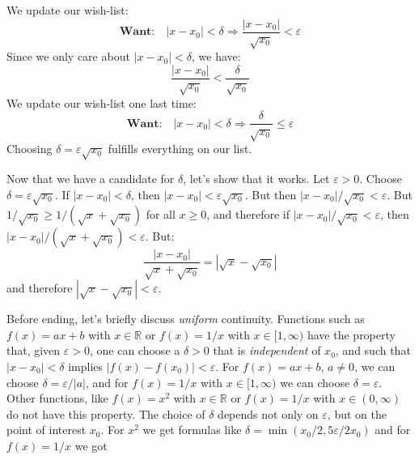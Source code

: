 \documentclass{article}
\theoremstyle{normal}
\theoremstyle{plain}
\begin{document}
    We update our wish-list:
    \begin{equation}
        \textbf{Want:}\quad
        |x-x_{0}|<\delta
        \Rightarrow
        \frac{|x-x_{0}|}{\sqrt{x_{0}}}<\varepsilon
    \end{equation}
    Since we only care about $|x-x_{0}|<\delta$, we have:
    \begin{equation}
        \frac{|x-x_{0}|}{\sqrt{x_{0}}}<\frac{\delta}{\sqrt{x_{0}}}
    \end{equation}
    We update our wish-list one last time:
    \begin{equation}
        \textbf{Want:}\quad
        |x-x_{0}|<\delta
        \Rightarrow
        \frac{\delta}{\sqrt{x_{0}}}\leq\varepsilon
    \end{equation}
    Choosing $\delta=\varepsilon\sqrt{x_{0}}$ fulfills everything on our list.
    \par\hfill\par
    Now that we have a candidate for $\delta$, let's show that it works.
    Let $\varepsilon>0$. Choose $\delta=\varepsilon\sqrt{x_{0}}$. If
    $|x-x_{0}|<\delta$, then $|x-x_{0}|<\varepsilon\sqrt{x_{0}}$. But then
    $|x-x_{0}|/\sqrt{x_{0}}<\varepsilon$. But
    $1/\sqrt{x_{0}}\geq1/(\sqrt{x}+\sqrt{x_{0}})$ for all $x\geq{0}$, and
    therefore if $|x-x_{0}|/\sqrt{x_{0}}<\varepsilon$, then
    $|x-x_{0}|/(\sqrt{x}+\sqrt{x_{0}})<\varepsilon$. But:
    \begin{equation}
        \frac{|x-x_{0}|}{\sqrt{x}+\sqrt{x_{0}}}=|\sqrt{x}-\sqrt{x_{0}}|
    \end{equation}
    and therefore $|\sqrt{x}-\sqrt{x_{0}}|<\varepsilon$.
    \par\hfill\par
    Before ending, let's briefly discuss \textit{uniform} continuity. Functions
    such as $f(x)=ax+b$ with $x\in\mathbb{R}$ or $f(x)=1/x$ with
    $x\in[1,\infty)$ have the property that, given $\varepsilon>0$, one can
    choose a $\delta>0$ that is \textit{independent} of $x_{0}$, and such that
    $|x-x_{0}|<\delta$ implies $|f(x)-f(x_{0})|<\varepsilon$. For
    $f(x)=ax+b$, $a\ne{0}$, we can choose $\delta=\varepsilon/|a|$, and for
    $f(x)=1/x$ with $x\in[1,\infty)$ we can choose
    $\delta=\varepsilon$. Other functions, like $f(x)=x^{2}$ with
    $x\in\mathbb{R}$ or $f(x)=1/x$ with $x\in(0,\infty)$ do not have this
    property. The choice of $\delta$ depends not only on $\varepsilon$, but on
    the point of interest $x_{0}$. For $x^{2}$ we get formulas like
    $\delta=\min(x_{0}/2,5\varepsilon/2x_{0})$ and for $f(x)=1/x$ we got
\end{document}
